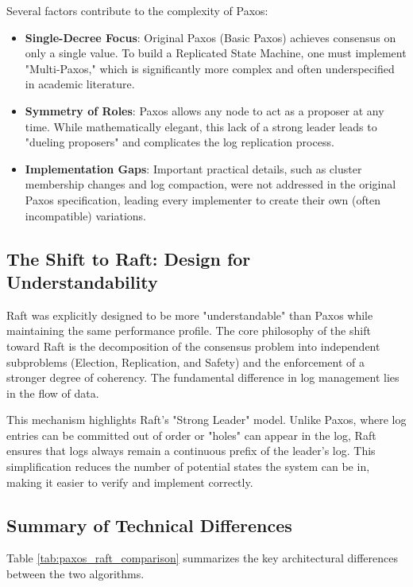 Several factors contribute to the complexity of Paxos:
\begin{itemize}
    \item \textbf{Single-Decree Focus}: Original Paxos (Basic Paxos) achieves consensus on only a single value. To build a Replicated State Machine, one must implement "Multi-Paxos," which is significantly more complex and often underspecified in academic literature.
    \item \textbf{Symmetry of Roles}: Paxos allows any node to act as a proposer at any time. While mathematically elegant, this lack of a strong leader leads to "dueling proposers" and complicates the log replication process.
    \item \textbf{Implementation Gaps}: Important practical details, such as cluster membership changes and log compaction, were not addressed in the original Paxos specification, leading every implementer to create their own (often incompatible) variations.
\end{itemize}

\subsection{The Shift to Raft: Design for Understandability}
Raft was explicitly designed to be more "understandable" than Paxos while maintaining the same performance profile.
The core philosophy of the shift toward Raft is the decomposition of the consensus problem into independent subproblems (Election, Replication, and Safety) and the enforcement of a stronger degree of coherency.
The fundamental difference in log management lies in the flow of data.

This mechanism highlights Raft's "Strong Leader" model.
Unlike Paxos, where log entries can be committed out of order or "holes" can appear in the log, Raft ensures that logs always remain a continuous prefix of the leader's log. This simplification reduces the number of potential states the system can be in, making it easier to verify and implement correctly.

\subsection{Summary of Technical Differences}
Table \ref{tab:paxos_raft_comparison} summarizes the key architectural differences between the two algorithms.

